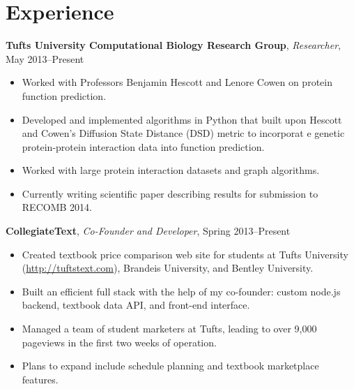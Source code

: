 \documentclass[10pt, letter]{article}
\begin{document}
\section*{Experience}
{\bf Tufts University Computational Biology Research Group}, {\em Researcher}, May 2013--Present\\
\vspace*{-.15in} 
\begin{itemize}[topsep=0pt,itemsep=-1pt]
    \item Worked with Professors Benjamin Hescott and Lenore Cowen on protein function prediction.
    \item Developed and implemented algorithms in Python that built upon Hescott and Cowen's Diffusion State Distance (DSD) metric to incorporat  e genetic protein-protein interaction data into function prediction.
    \item Worked with large protein interaction datasets and graph algorithms.
    \item Currently writing scientific paper describing results for submission to RECOMB 2014.
\end{itemize}
\vspace{6pt}
{\bf CollegiateText}, {\em Co-Founder and Developer}, Spring 2013--Present\\
\vspace*{-.15in}
\begin{itemize}[topsep=0pt,itemsep=-1pt]
            \item Created textbook price comparison web site for students at Tufts University (\url{http://tuftstext.com}), Brandeis University, and Bentley University.
            \item Built an efficient full stack with the help of my co-founder: custom node.js backend, textbook data API, and front-end interface. 
            \item Managed a team of student marketers at Tufts, leading to over 9,000 pageviews in the first two weeks of operation.
            \item Plans to expand include schedule planning and textbook marketplace features.
        \end{itemize}
\end{document}

